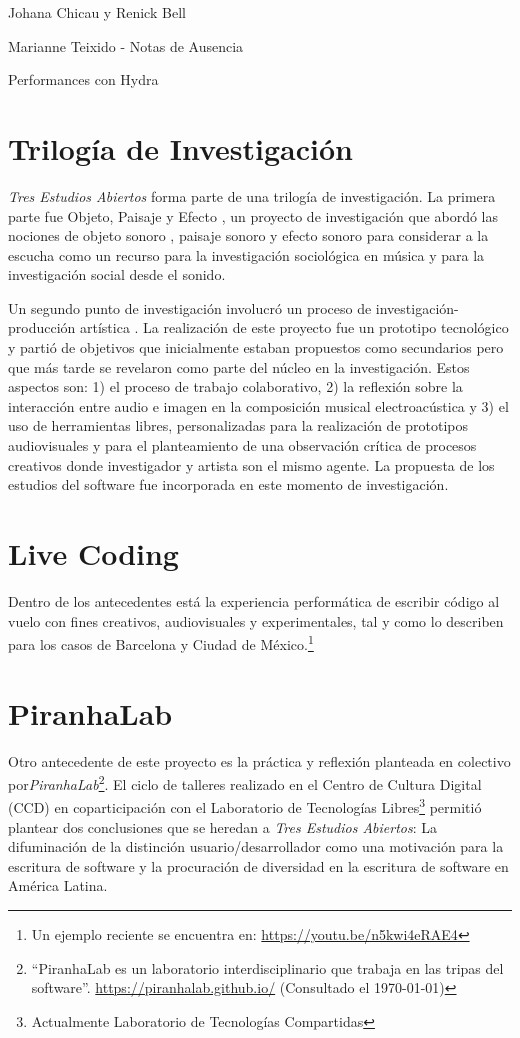 Johana Chicau y Renick Bell

Marianne Teixido - Notas de Ausencia

Performances con Hydra

\section{Trilogía de Investigación}

\textit{Tres Estudios Abiertos} forma parte de una trilogía de investigación. La primera parte fue Objeto, Paisaje y Efecto \citep{ocelotlLic}, un proyecto de investigación que abordó las nociones de objeto sonoro \citep{schaeffer}, paisaje sonoro\citep{schafer1} y efecto sonoro \citep{augoyard} para considerar a la escucha como un recurso para la investigación sociológica en música y para la investigación social desde el sonido. 

Un segundo punto de investigación involucró un proceso de investigación-producción artística \citep{ocelotlMas}. La realización de este proyecto fue un prototipo tecnológico y partió de objetivos que inicialmente estaban propuestos como secundarios pero que más tarde se revelaron como parte del núcleo en la investigación. Estos aspectos son: 1) el proceso de trabajo colaborativo, 2) la reflexión sobre la interacción entre audio e imagen en la composición musical electroacústica y 3) el uso de herramientas libres, personalizadas para la realización de prototipos audiovisuales y para el planteamiento de una observación crítica de procesos creativos donde investigador y artista son el mismo agente. La propuesta de los estudios del software fue incorporada en este momento de investigación. 

\section{Live Coding}

Dentro de los antecedentes está la experiencia performática de escribir código al vuelo con fines creativos, audiovisuales y experimentales, tal y como lo describen \cite{villasenor} para los casos de Barcelona y Ciudad de México.\footnote{Un ejemplo reciente se encuentra en: \url{https://youtu.be/n5kwi4eRAE4}} 

\section{PiranhaLab}

Otro antecedente de este proyecto es la práctica y reflexión planteada en colectivo por\textit{PiranhaLab}\footnote{``PiranhaLab es un laboratorio interdisciplinario que trabaja en las tripas del software''. \url{https://piranhalab.github.io/} (Consultado el \today)}. El ciclo de talleres realizado en el Centro de Cultura Digital (CCD) en coparticipación con el Laboratorio de Tecnologías Libres\footnote{Actualmente Laboratorio de Tecnologías Compartidas} permitió plantear dos conclusiones que se heredan a \textit{Tres Estudios Abiertos}: La difuminación de la distinción usuario/desarrollador como una motivación para la escritura de software y la procuración de diversidad en la escritura de software en América Latina.

